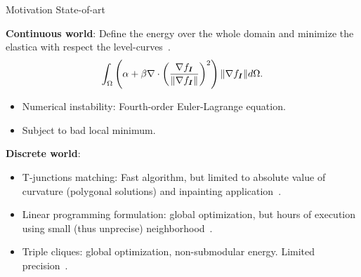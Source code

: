 \begin{frame}
{Motivation}
{State-of-art}

\textbf{Continuous world}: Define the energy over the whole domain and minimize the elastica with respect the level-curves~\cite{chan02elasticainpainting}.
%
\begin{align*}
\int_{\Omega}{ \left(\alpha + \beta \nabla \cdot \left(\frac{\nabla f_{\bm{I}}}{\lVert\nabla f_{\bm{I}} \rVert}\right) ^2 \right)\lVert\nabla f_{\bm{I}} \rVert d\Omega}.
\end{align*}
%
\pause
\begin{itemize}
\item{Numerical instability: Fourth-order Euler-Lagrange equation.}
\item{Subject to bad local minimum.}
\end{itemize}
%
\pause
\vspace{1em}
\textbf{Discrete world}:

\begin{itemize}
\item{T-junctions matching: Fast algorithm, but limited to absolute value of curvature (polygonal solutions) and inpainting application~\cite{masnou98inpainting}.}\pause
\item{Linear programming formulation: global optimization, but hours of execution using small (thus unprecise) neighborhood~\cite{schoenemann09linear}.}\pause
\item{Triple cliques: global optimization, non-submodular energy. Limited precision~\cite{nieuwenhuis14efficient}.}
\end{itemize}
\end{frame}

